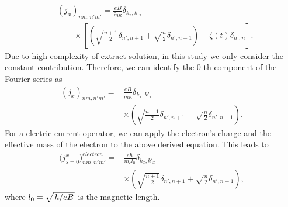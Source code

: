 \documentclass[
 reprint,
 amsmath,amssymb,
 aps,
 prb,
]{revtex4-2}
\begin{document}
{\begin{equation} \label{eq:d9}
  \begin{aligned}
    &\left({j}_x \right)_{nm,n'm'} =
    \frac{eB}{{\widetilde{m}}\kappa}
    \delta_{k_x,k'_x} \\
    & \qquad\times
    \left[
    \left(\sqrt{\frac{n+1}{2}} \delta_{n',n+1} + \sqrt{\frac{n}{2}}
    \delta_{n',n-1}\right)
    + \zeta(t) \delta_{n',n}
    \right].
  \end{aligned}
\end{equation}
Due to high complexity of extract solution, in this study we only consider the constant contribution. Therefore, we can identify the $0$-th component of the Fourier series as
\begin{equation} \label{eq:d10}
  \begin{aligned}
      \left({j}_x \right)_{nm,n'm'} =&
      \frac{eB}{\widetilde{m}\kappa}
      \delta_{k_x,k'_x} \\
      & \times
      \left(\sqrt{\frac{n+1}{2}} \delta_{n',n+1} + \sqrt{\frac{n}{2}}
      \delta_{n',n-1} \right).
  \end{aligned}
\end{equation}
For a electric current operator, we can apply the electron's charge and the  effective mass of the electron to the above derived equation. This leads to
\begin{equation} \label{eq:d11}
  \begin{aligned}
      \Big({j}^x_{s=0}\Big)_{nm,n'm'}^{electron}  =&
      \frac{e\hbar}{{m_e}l_0}
      \delta_{k_x,k'_x}\\
      & \times
      \left(\sqrt{\frac{n+1}{2}} \delta_{n',n+1} + \sqrt{\frac{n}{2}}
      \delta_{n',n-1} \right),
  \end{aligned}
\end{equation}
where $l_0 = \sqrt{\flatfrac{\hbar}{eB}}$ is the magnetic length.

}
\end{document}
